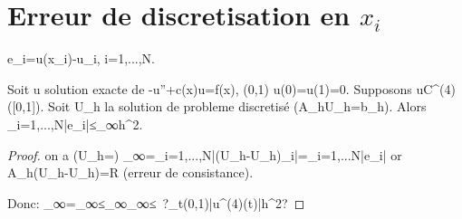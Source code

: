 \section{Erreur de discretisation en $x_i$} %
\label{sec:erreur_de_discretisation_en_x_i}
e_i=u(x_i)-u_i, \forall i=1,...,N.

\begin{theorem}
	Soit u solution exacte de -u''+c(x)u=f(x),  (0,1) u(0)=u(1)=0. Supposons u\in C^{(4)}([0,1]). Soit U_h la solution de probleme discretisé (A_hU_h=b_h). Alors \max_{i=1,...,N}|e_i|≤_∞h^2.
\end{theorem}
\begin{proof}
	on a (\tilde U_h=) _∞=\max_{i=1,...,N}|(\tilde U_h-U_h)_i|=\max_{i=1,...N}|e_i| or A_h(\tilde U_h-U_h)=R (erreur de consistance).
	
	Donc: _∞=_∞≤_∞_∞≤\  ?\sup_{t\in(0,1)}|u^{(4)}(t)|h^2?
\end{proof}

